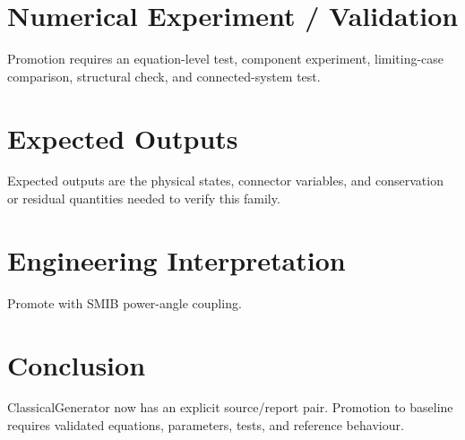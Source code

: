 \documentclass[10pt,a4paper]{article}
\begin{document}
\section{Numerical Experiment / Validation}Promotion requires an equation-level test, component experiment, limiting-case comparison, structural check, and connected-system test.
\section{Expected Outputs}Expected outputs are the physical states, connector variables, and conservation or residual quantities needed to verify this family.
\section{Engineering Interpretation}Promote with SMIB power-angle coupling.
\section*{Conclusion}ClassicalGenerator now has an explicit source/report pair. Promotion to baseline requires validated equations, parameters, tests, and reference behaviour.
\end{document}
